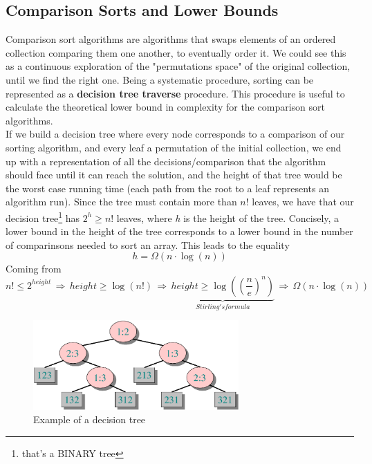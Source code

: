 \documentclass{article}
\begin{document}
		\subsection{Comparison Sorts and Lower Bounds}
			Comparison sort algorithms are algorithms that swaps elements of an ordered collection comparing them one another, to eventually order it. We could see this as a continuous exploration of the "permutations space" of the original collection, until we find the right one. Being a systematic procedure, sorting can be represented as a \textbf{decision tree traverse} procedure. This procedure is useful to calculate the theoretical lower bound in complexity for the comparison sort algorithms.\\
			If we build a decision tree where every node corresponds to a comparison of our sorting algorithm, and every leaf a permutation of the initial collection, we end up with a representation of all the decisions/comparison that the algorithm should face until it can reach the solution, and the height of that tree would be the worst case running time (each path from the root to a leaf represents an algorithm run). Since the tree must contain more than $n!$ leaves, we have that our decision tree\footnote{that's a BINARY tree} has $2^h \geq n!$ leaves, where \emph{h} is the height of the tree. Concisely, a lower bound in the height of the tree corresponds to a lower bound in the number of comparinsons needed to sort an array. This leads to the equality
			\begin{equation}
				h = \Omega(n \cdot \log (n))
			\end{equation}
			Coming from
			\begin{equation}
				n! \leq 2^{height} \,\Rightarrow\, height \geq \log(n!) \,\Rightarrow\, \underbrace{height \geq \log((\frac{n}{e})^n)}_{Stirling's formula} \,\Rightarrow\, \Omega(n \cdot \log(n))
			\end{equation}

	    \begin{figure}[H]
	    	\centering
				\includegraphics[width = 0.7\textwidth]{images/decision_tree_example.png}
				\caption{Example of a decision tree}
			\end{figure}
\end{document}
